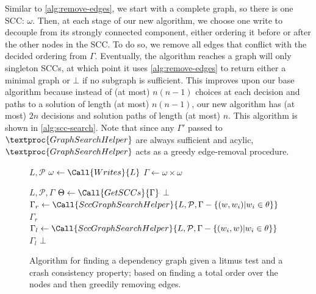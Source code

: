 Similar to \autoref{alg:remove-edges}, we start with a complete graph, so there is one SCC: $\omega$.
Then, at each stage of our new algorithm, we choose one write to decouple from its strongly connected component,
either ordering it before or after the other nodes in the SCC. To do so, we remove all edges that conflict
with the decided ordering from $\Gamma$. Eventually, the algorithm reaches a graph will only singleton SCCs,
at which point it uses \autoref{alg:remove-edges} to return either a minimal graph or $\bot$ if no subgraph
is sufficient. This improves upon our base algorithm because instead of (at most) $n(n-1)$
choices at each decision and paths to a solution of length (at most) $n(n-1)$, our new algorithm has (at most) $2n$
decisions and solution paths of length (at most) $n$. This algorithm is shown in \autoref{alg:scc-search}.
Note that since any $\Gamma'$ passed to $\textproc{GraphSearchHelper}$ are always
sufficient and acylic, $\textproc{GraphSearchHelper}$ acts as a greedy edge-removal procedure.

\begin{figure}[h]
\begin{algorithmic}[1]
    {$L, \mathcal{P}$} 
    \State $\omega \gets \Call{Writes}{L}$ 
    \State $\Gamma \gets \omega \times \omega$ 
    \State \Return {}
  \EndFunction

    {$L, \mathcal{P}, \Gamma$} 
    \State $\Theta \gets \Call{GetSCCs}{\Gamma}$
      \State \Return {}
    \EndIf
      \State \Return $\bot$
    \EndIf
    \For{$\theta\in\Theta$}
        \State $\Gamma_r \gets \Call{SccGraphSearchHelper}{L, \mathcal{P}, \Gamma - \{(w, w_i) | w_i \in \theta\}}$
          \State \Return $\Gamma_r$
        \EndIf
        \State $\Gamma_l \gets \Call{SccGraphSearchHelper}{L, \mathcal{P}, \Gamma - \{(w_i, w) | w_i \in \theta\}}$
          \State \Return $\Gamma_l$
        \EndIf
      \EndFor
    \EndFor
    \State \Return $\bot$ 
  \EndFunction
\end{algorithmic}
\caption{Algorithm for finding a dependency graph given a litmus test and a crash consistency
property; based on finding a total order over the nodes and then greedily removing edges.\tighten}
\label{alg:scc-search}
\end{figure}

